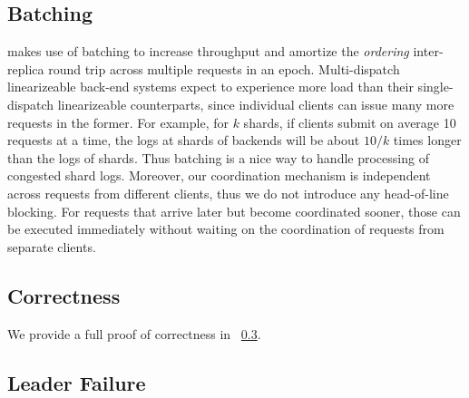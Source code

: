 \subsection{Batching}
\md makes use of batching to increase throughput and amortize the \textit{ordering} inter-replica round trip across multiple requests in an epoch. Multi-dispatch linearizeable back-end systems expect to experience more load than their single-dispatch linearizeable counterparts, since individual clients can issue many more requests in the former. For example, for $k$ shards, if clients submit on average 10 requests at a time, the logs at shards of \md backends will be about $10/k$ times longer than the logs of \sd shards. Thus batching is a nice way to handle processing of congested shard logs. Moreover, our coordination mechanism is independent across requests from different clients, thus we do not introduce any head-of-line blocking. For requests that arrive later but become coordinated sooner, those can be executed immediately without waiting on the coordination of requests from separate clients.

\subsection{Correctness}
We provide a full proof of correctness in ~\ref{}.

\subsection{Leader Failure}


